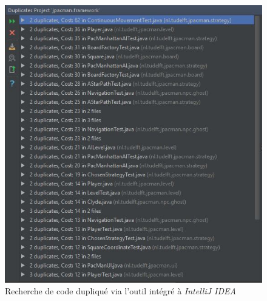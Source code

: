 \documentclass[12pt, openany]{report}
\begin{document}
\begin{figure}[h]
	\centering
	\includegraphics{Images/duplicate_analysis.JPG}
	\caption{\label{duplicate} Recherche de code dupliqué via l'outil intégré à \textit{IntelliJ IDEA}}
\end{figure}
\end{document}
